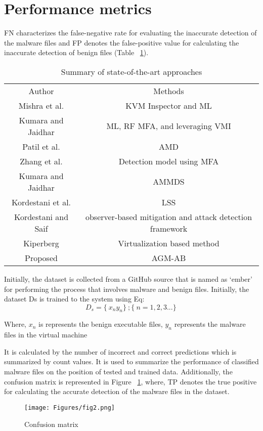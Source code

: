 \documentclass{gji}
\begin{document}
\section {Performance metrics}
FN characterizes the false-negative rate for evaluating the inaccurate detection of the malware files and FP denotes the false-positive value for calculating the inaccurate detection of benign files (Table ~\ref{tab:freq1}).
\begin{table}
  \caption{Summary of state-of-the-art approaches}
  \label{tab:freq1}
  \begin{tabular}{cc}
    Author&Methods\\
        Mishra et al.&KVM Inspector and ML\\
        Kumara and Jaidhar&ML, RF MFA, and leveraging VMI\\
        Patil et al.&AMD\\
        Zhang et al.&Detection model using MFA\\
        Kumara and Jaidhar&AMMDS\\
        Kordestani et al.&LSS\\
        Kordestani and Saif&observer-based mitigation and attack detection framework\\
        Kiperberg&Virtualization based method\\
        Proposed&AGM-AB\\
\end{tabular}
\end{table}
\par Initially, the dataset is collected from a GitHub source that is named as ‘ember’ for performing the process that involves malware and benign files. Initially, the dataset Ds is trained to the system using Eq:
$$
D_s =  \{\ x_n y_n\}\ ; \{\ n = 1,2,3...\}\,
$$
\par Where, $x_n$ is represents the benign executable files, $y_n$ represents the malware files in the virtual machine
\par It is calculated by the number of incorrect and correct predictions which is summarized by count values. It is used to summarize the performance of classified malware files on the position of tested and trained data. Additionally, the confusion matrix is represented in Figure ~\ref{Figure 2:image}, where, TP denotes the true positive for calculating the accurate detection of the malware files in the dataset. 
\begin{figure}
  \centering
  \texttt{[image: Figures/fig2.png]}
  \caption{Confusion matrix}
  \label{Figure 2:image}
\end{figure}
\end{document}
